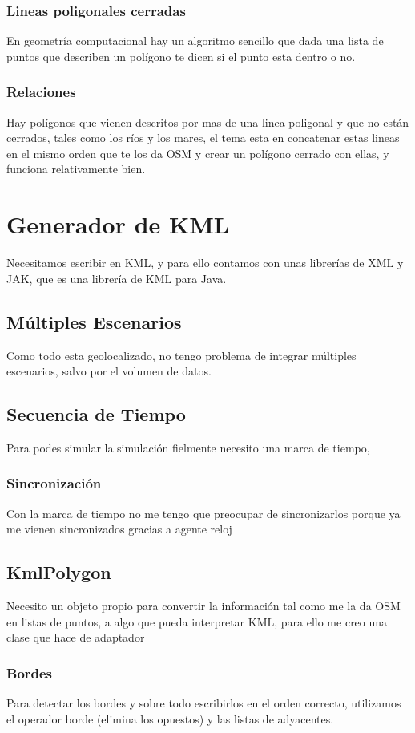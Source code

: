 \subsubsection*{Lineas poligonales cerradas}
En geometría computacional hay un algoritmo sencillo que dada una lista de
puntos que describen un polígono te dicen si el punto esta dentro o no.
\subsubsection*{Relaciones}
Hay polígonos que vienen descritos por mas de una linea poligonal y que no
están cerrados, tales como los ríos y los mares, el tema esta en concatenar
estas lineas en el mismo orden que te los da OSM y crear un polígono cerrado
con ellas, y funciona relativamente bien.
\section*{Generador de KML}
Necesitamos escribir en KML, y para ello contamos con unas librerías de XML y
JAK, que es una librería de KML para Java.
\subsection*{Múltiples Escenarios}
Como todo esta geolocalizado, no tengo problema de integrar múltiples
escenarios, salvo por el volumen de datos.
\subsection*{Secuencia de Tiempo}
Para podes simular la simulación fielmente necesito una marca de tiempo, 
\subsubsection*{Sincronización}
Con la marca de tiempo no me tengo que preocupar de sincronizarlos porque ya me
vienen sincronizados gracias a agente reloj
\subsection*{KmlPolygon}
Necesito un objeto propio para convertir la información tal como me la da OSM
en listas de puntos, a algo que pueda interpretar KML, para ello me creo una
clase que hace de adaptador
\subsubsection*{Bordes}
Para detectar los bordes y sobre todo escribirlos en el orden correcto,
utilizamos el operador borde (elimina los opuestos) y las listas de adyacentes.

